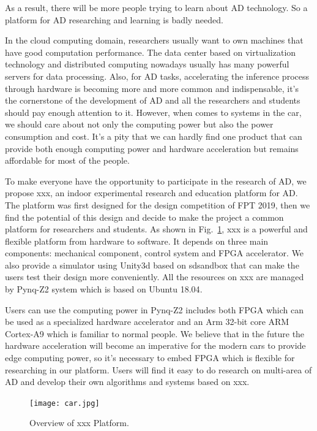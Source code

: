 \documentclass[conference]{IEEEtran}
\begin{document}
As a result, there will be more people trying to learn about AD technology. So a platform for AD researching and learning is badly needed. 

In the cloud computing domain, researchers usually want to own machines that have good computation performance. The data center based on virtualization technology\cite{b2} and distributed computing\cite{b3} nowadays usually has many powerful servers for data processing. Also, for AD tasks, accelerating the inference process through hardware is becoming more and more common and indispensable, it's the cornerstone of the development of AD and all the researchers and students should pay enough attention to it. However, when comes to systems in the car, we should care about not only the computing power but also the power consumption and cost. It's a pity that we can hardly find one product that can provide both enough computing power and hardware acceleration but remains affordable for most of the people.

To make everyone have the opportunity to participate in the research of AD, we propose xxx, an indoor experimental research and education platform for AD. The platform was first designed for the design competition of FPT 2019\cite{}, then we find the potential of this design and decide to make the project a common platform for researchers and students. As shown in Fig.~\ref{ov}, xxx is a powerful and flexible platform from hardware to software. It depends on three main components: mechanical component, control system and FPGA accelerator. We also provide a simulator using Unity3d\cite{b4} based on sdsandbox\cite{b5} that can make the users test their design more conveniently. All the resources on xxx are managed by Pynq-Z2\cite{b6} system which is based on Ubuntu 18.04\cite{b7}. 

Users can use the computing power in Pynq-Z2 includes both FPGA which can be used as a specialized hardware accelerator and an Arm 32-bit core ARM Cortex-A9\cite{b8} which is familiar to normal people. We believe that in the future the hardware acceleration will become an imperative for the modern cars to provide edge computing power, so it's necessary to embed FPGA which is flexible for researching in our platform. Users will find it easy to do research on multi-area of AD and develop their own algorithms and systems based on xxx.

\begin{figure}[htbp]
\centerline{\texttt{[image: car.jpg]}}
\caption{Overview of xxx Platform.}
\label{ov}
\end{figure}
\end{document}
